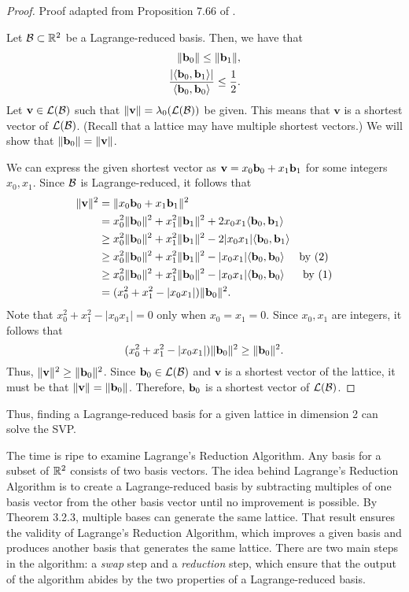 \documentclass[a4paper,12pt]{article}
\begin{document}
\begin{proof}
Proof adapted from Proposition 7.66 of \cite{HPS}. 

    Let $\mathcal{B} \subset \mathbb{R}^2$ be a Lagrange-reduced basis. Then, we have that 
    \begin{align}
        \|\mathbf{b}_0\| \leq \|\mathbf{b}_1\|, \\
        \frac{| \langle \mathbf{b}_0, \mathbf{b}_1 \rangle |}{\langle \mathbf{b}_0, \mathbf{b}_0 \rangle} \leq \frac{1}{2}.
    \end{align} 
    Let $\mathbf{v} \in \mathcal{L}(\mathcal{B})$ such that  $\|\mathbf{v}\| = \lambda_{0}(\mathcal{L}(\mathcal{B}))$ be given. This means that $\mathbf{v}$ is a shortest vector of $\mathcal{L}(\mathcal{B})$. (Recall that a lattice may have multiple shortest vectors.) We will show that $\|\mathbf{b}_0\| = \|\mathbf{v}\|$.
    
    We can express the given shortest vector as $\mathbf{v} = x_{0}\mathbf{b}_0 + x_{1}\mathbf{b}_1$ for some integers $x_0, x_1$. Since $\mathcal{B}$ is Lagrange-reduced, it follows that 
    \begin{align*}
    \|\mathbf{v}\|^2 &= \|x_0\mathbf{b}_0 + x_1\mathbf{b}_1\|^2 \\
                     &= x_0^2\|\mathbf{b}_0\|^2 + x_1^2\|\mathbf{b}_1\|^2 + 2x_0x_1\langle \mathbf{b}_0, \mathbf{b}_1 \rangle \\
                     &\geq x_0^2\|\mathbf{b}_0\|^2 + x_1^2\|\mathbf{b}_1\|^2 - 2|x_0x_1|\langle\mathbf{b}_0, \mathbf{b}_1 \rangle \\
                     &\geq x_0^2\|\mathbf{b}_0\|^2 + x_1^2\|\mathbf{b}_1\|^2 - |x_0x_1|\langle\mathbf{b}_0, \mathbf{b}_0 \rangle \text{\,\,\,\,\,\,\,\,by (2)} \\ 
                     &\geq x_0^2\|\mathbf{b}_0\|^2 + x_1^2\|\mathbf{b}_0\|^2 - |x_0x_1|\langle\mathbf{b}_0,\mathbf{b}_0 \rangle \text{\,\,\,\,\,\,\,\,\,\,by (1)} \\
                     &= (x_0^2 + x_1^2 - |x_0x_1|)\|\mathbf{b}_0\|^2.
    \end{align*}
    Note that $x_0^2 + x_1^2 - |x_0x_1| = 0$ only when $x_0 = x_1 = 0$. Since $x_0,x_1$ are integers, it follows that $$(x_0^2 + x_1^2 - |x_0x_1|)\|\mathbf{b}_0\|^2 \geq \|\mathbf{b}_0\|^2.$$ Thus, $\|\mathbf{v}\|^2 \geq \|\mathbf{b}_0\|^2$. Since $\mathbf{b}_0 \in \mathcal{L}(\mathcal{B})$ and $\mathbf{v}$ is a shortest vector of the lattice, it must be that $\|\mathbf{v}\| = \|\mathbf{b}_0\|$. Therefore, $\mathbf{b}_0$ is a shortest vector of $\mathcal{L}(\mathcal{B})$.
\end{proof}

Thus, finding a Lagrange-reduced basis for a given lattice in dimension 2 can solve the SVP. 

The time is ripe to examine Lagrange's Reduction Algorithm. Any basis for a subset of $\mathbb{R}^2$ consists of two basis vectors. The idea behind Lagrange's Reduction Algorithm is to create a Lagrange-reduced basis by subtracting multiples of one basis vector from the other basis vector until no improvement is possible. By Theorem 3.2.3, multiple bases can generate the same lattice. That result ensures the validity of Lagrange's Reduction Algorithm, which improves a given basis and produces another basis that generates the same lattice. There are two main steps in the algorithm: a \textit{swap} step and a \textit{reduction} step, which ensure that the output of the algorithm abides by the two properties of a Lagrange-reduced basis. 
\end{document}
